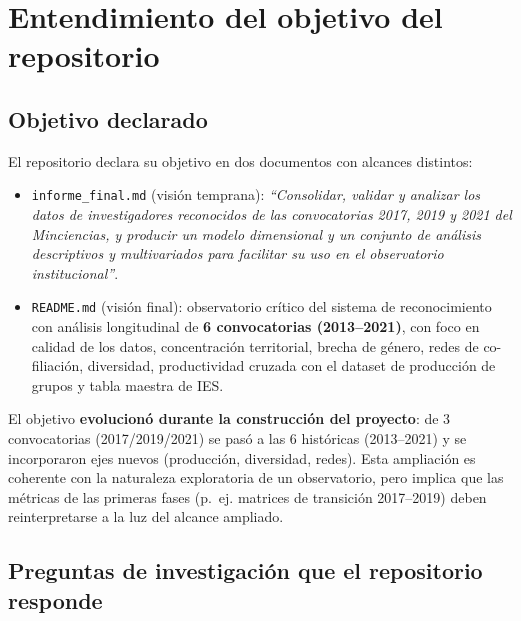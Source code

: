 
\section{Entendimiento del objetivo del repositorio}

\subsection{Objetivo declarado}

El repositorio declara su objetivo en dos documentos con alcances distintos:

\begin{itemize}
  \item \texttt{informe\_final.md} (visión temprana): \emph{``Consolidar, validar y
        analizar los datos de investigadores reconocidos de las convocatorias 2017,
        2019 y 2021 del Minciencias, y producir un modelo dimensional y un conjunto
        de análisis descriptivos y multivariados para facilitar su uso en el
        observatorio institucional''}.
  \item \texttt{README.md} (visión final): observatorio crítico del sistema de
        reconocimiento con análisis longitudinal de \textbf{6 convocatorias
        (2013--2021)}, con foco en calidad de los datos, concentración territorial,
        brecha de género, redes de co-filiación, diversidad, productividad cruzada
        con el dataset de producción de grupos y tabla maestra de IES.
\end{itemize}

\begin{tcolorbox}[nota]
El objetivo \textbf{evolucionó durante la construcción del proyecto}: de 3
convocatorias (2017/2019/2021) se pasó a las 6 históricas (2013--2021) y se
incorporaron ejes nuevos (producción, diversidad, redes). Esta ampliación es
coherente con la naturaleza exploratoria de un observatorio, pero implica que las
métricas de las primeras fases (p.~ej. matrices de transición 2017--2019) deben
reinterpretarse a la luz del alcance ampliado.
\end{tcolorbox}

\subsection{Preguntas de investigación que el repositorio responde}

